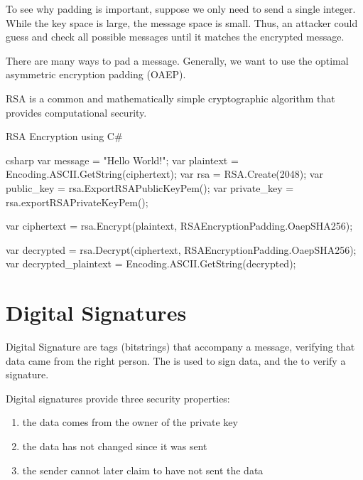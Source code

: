 \documentclass[code]{amznotes}
\begin{document}
To see why padding is important, suppose we only need to send a single integer. While the key space is large, the message space is small. Thus, an attacker could guess and check all possible messages until it matches the encrypted message.

There are many ways to pad a message. Generally, we want to use the optimal asymmetric encryption padding (OAEP).

\begin{dfnbox}{RSA}{}
     is a common and mathematically simple cryptographic algorithm that provides computational security.
\end{dfnbox}

\begin{codebox}{RSA Encryption using C\#}{}{}
    \begin{amzcode}{csharp}
        var message = "Hello World!";
        var plaintext = Encoding.ASCII.GetString(ciphertext);
        var rsa = RSA.Create(2048);
        var public_key = rsa.ExportRSAPublicKeyPem();
        var private_key = rsa.exportRSAPrivateKeyPem();

        var ciphertext = rsa.Encrypt(plaintext, RSAEncryptionPadding.OaepSHA256);

        var decrypted = rsa.Decrypt(ciphertext, RSAEncryptionPadding.OaepSHA256);
        var decrypted_plaintext = Encoding.ASCII.GetString(decrypted);
    \end{amzcode}
\end{codebox}

\section{Digital Signatures}

\begin{dfnbox}{Digital Signature}{}
     are tags (bitstrings) that accompany a message, verifying that data came from the right person. The  is used to sign data, and the  to verify a signature.
\end{dfnbox}

Digital signatures provide three security properties:
\begin{enumerate}[noitemsep]
    \item {} the data comes from the owner of the private key
    \item {} the data has not changed since it was sent
    \item {} the sender cannot later claim to have not sent the data
\end{enumerate}
\end{document}
